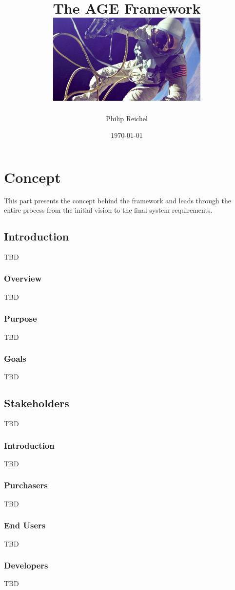 \documentclass[a4paper,12pt]{book}
\title{
The AGE Framework
\linebreak
\linebreak
\includegraphics[width=8cm]{spacewalk.png}
}
\author{Philip Reichel}
\date{\today}
\begin{document}
\maketitle
\tableofcontents

\part{Concept}
This part presents the concept behind the framework and leads through the entire process from the initial vision to the final system requirements.

\chapter{Introduction}
TBD

\section{Overview}
TBD

\section{Purpose}
TBD

\section{Goals}
TBD

\chapter{Stakeholders}
TBD

\section{Introduction}
TBD

\section{Purchasers}
TBD

\section{End Users}
TBD

\section{Developers}
TBD
\end{document}
